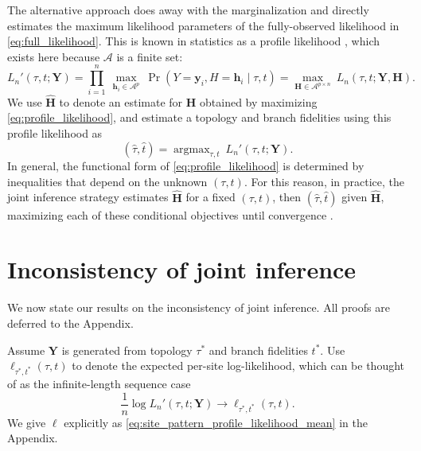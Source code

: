 \documentclass{article}
\newcommand{\alphabet}{\mathcal{A}}
\newcommand{\fullAlignment}{\mathbf{Y}}
\newcommand{\alignmentColumn}{\mathbf{y}}
\newcommand{\alignmentColumnRV}{Y}
\newcommand{\fullAncestralStates}{\mathbf{H}}
\newcommand{\ancestralStateColumn}{\mathbf{h}}
\newcommand{\ancestralStateColumnRV}{H}
\newcommand{\nCols}{n}
\newcommand{\nAncestralStateRows}{p}
\DeclareMathOperator*{\argmax}{argmax}
\begin{document}
The alternative approach \cite{Sagulenko2017-jo} does away with the marginalization and directly estimates the maximum likelihood parameters of the fully-observed likelihood in \eqref{eq:full_likelihood}.
This is known in statistics as a profile likelihood \cite{Murphy2000-ry}, which exists here because $\alphabet$ is a finite set:
\begin{equation}
\label{eq:profile_likelihood}
L_\nCols'(\tau, t; \fullAlignment) = \prod_{i=1}^{\nCols} \ \max_{\ancestralStateColumn_i\in\alphabet^{\nAncestralStateRows}} \ \Pr(\alignmentColumnRV=\alignmentColumn_i, \ancestralStateColumnRV=\ancestralStateColumn_i \mid \tau, t) = \max_{\fullAncestralStates\in\alphabet^{\nAncestralStateRows\times\nCols}} \ L_\nCols(\tau, t; \fullAlignment, \fullAncestralStates).
\end{equation}
We use $\hat{\fullAncestralStates}$ to denote an estimate for $\fullAncestralStates$ obtained by maximizing \eqref{eq:profile_likelihood}, and estimate a topology and branch fidelities using this profile likelihood as
\begin{equation}
\label{eq:profile_likelihood_topology_bl}
(\hat{\tau}, \hat{t}) = \argmax_{\tau, t} \ L_\nCols'(\tau, t; \fullAlignment).
\end{equation}
In general, the functional form of \eqref{eq:profile_likelihood} is determined by inequalities that depend on the unknown $(\tau,t)$.
For this reason, in practice, the joint inference strategy estimates $\hat{\fullAncestralStates}$ for a fixed $(\tau,t)$, then $(\hat{\tau},\hat{t})$ given $\hat{\fullAncestralStates}$, maximizing each of these conditional objectives until convergence \cite{Sagulenko2017-jo}.


\section*{Inconsistency of joint inference}

We now state our results on the inconsistency of joint inference.
All proofs are deferred to the Appendix.

Assume $\fullAlignment$ is generated from topology $\tau^*$ and branch fidelities $t^*$.
Use $\ell_{\tau^*,t^*}(\tau, t)$ to denote the expected per-site log-likelihood, which can be thought of as the infinite-length sequence case
$$
\frac{1}{n}\log L_\nCols'(\tau, t; \fullAlignment) \rightarrow \ell_{\tau^*,t^*}(\tau, t).
$$
We give $\ell$ explicitly as \eqref{eq:site_pattern_profile_likelihood_mean} in the Appendix.
\end{document}

